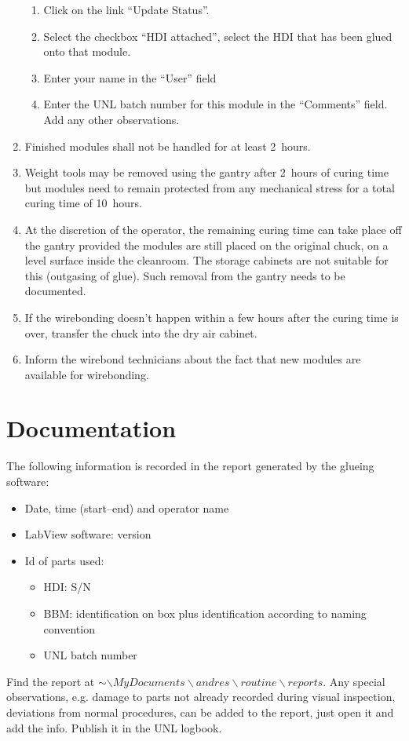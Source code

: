 \documentclass[12pt]{unlsilabsop}
\begin{document}
\begin{enumerate}
\begin{enumerate}
        \item Click on the link ``Update Status''.
        \item Select the checkbox ``HDI attached'', select the HDI that has been glued onto that module.
        \item Enter your name in the ``User'' field
        \item Enter the UNL batch number for this module in the ``Comments'' field. Add any other observations.
    \end{enumerate}
    \item Finished modules shall not be handled for at least 2~hours.
    \item Weight tools may be removed using the gantry after 2~hours of curing time but modules need to remain protected from any mechanical stress for a total curing time of 10~hours.
    \item At the discretion of the operator, the remaining curing time can take place off the gantry provided the modules are still placed on the original chuck, on a level surface inside the cleanroom. The storage cabinets are not suitable for this (outgasing of glue). Such removal from the gantry needs to be documented.
    \item If the wirebonding doesn't happen within a few hours after the curing time is over, transfer the chuck into the dry air cabinet.
    \item Inform the wirebond technicians about the fact that new modules are available for wirebonding.
\end{enumerate}

\section{Documentation}
The following information is recorded in the report generated by the glueing software:
\begin{itemize}
    \item Date, time (start--end) and operator name
    \item LabView software: version
    \item Id of parts used:
	\begin{itemize}
	    \item HDI: S/N
	    \item BBM: identification on box plus identification according to naming convention
	    \item UNL batch number
	\end{itemize}
\end{itemize}

Find the report at $\sim\backslash MyDocuments\backslash andres\backslash routine\backslash reports$. Any special observations, e.g. damage to parts not already recorded during visual inspection, deviations from normal procedures, can be added to the report, just open it  and add the info. Publish it in the UNL logbook. 
\end{document}

